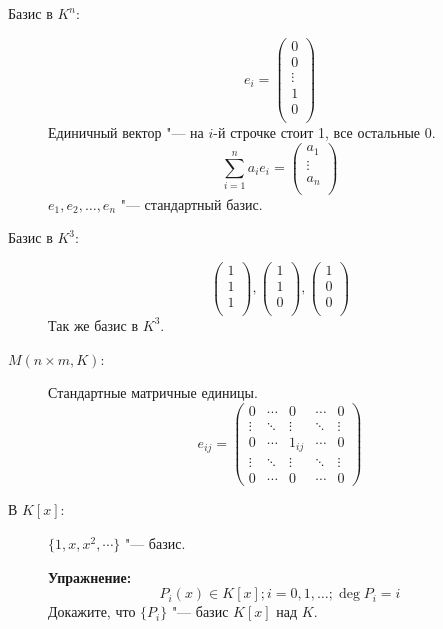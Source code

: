 \begin{exmp}
	\begin{description}
	\item[Базис в $K^n$:]
		\[
			e_i =
			\begin{pmatrix}
				0\\
				0\\
				\vdots\\
				1\\
				0\\
			\end{pmatrix}
		\]
		Единичный вектор "--- на $i$-й строчке стоит 1, все остальные 0.
		\[
			\sum_{i = 1}^{n}a_ie_i =
			\begin{pmatrix}
				a_1\\
				\vdots\\
				a_n\\
			\end{pmatrix}
		\]
		$e_1, e_2, \dots, e_n$ "--- стандартный базис.

	\item[Базис в $K^3$:]
		\[
			\begin{pmatrix}
				1\\1\\1\\
			\end{pmatrix}
			,
			\begin{pmatrix}
				1\\1\\0\\
			\end{pmatrix}
			,
			\begin{pmatrix}
				1\\0\\0\\
			\end{pmatrix}
		\]
		Так же базис в $K^3$.

	\item[$M(n \times m, K)$:]
		Стандартные матричные единицы.
		\[
			e_{ij} =
			\begin{pmatrix}
				0      & \cdots & 0      & \cdots & 0      \\
				\vdots & \ddots & \vdots & \ddots & \vdots \\
				0      & \cdots & 1_{ij} & \cdots & 0      \\
				\vdots & \ddots & \vdots & \ddots & \vdots \\
				0      & \cdots & 0      & \cdots & 0
			\end{pmatrix}
		\]

	\item[В {$K[x]$}:]
		$\{1, x, x^2, \cdots \}$ "--- базис.

		\textbf{Упражнение:}
			\[ P_i(x) \in K[x]; i = 0, 1, \dots; \deg P_i = i \]
			Докажите, что $\{P_i\}$ "--- базис $K[x]$ над $K$.
	\end{description}
\end{exmp}

